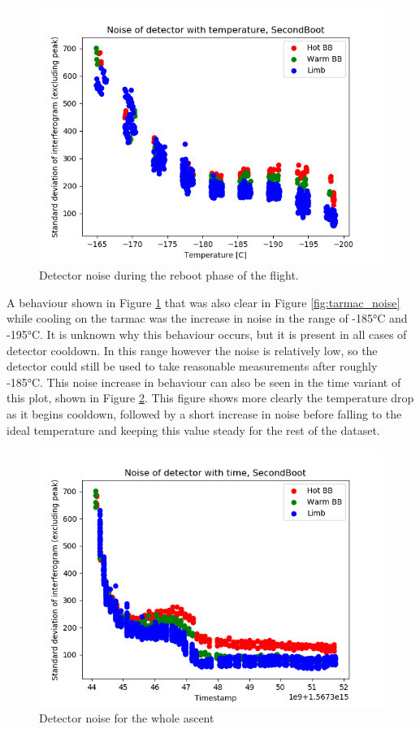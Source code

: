 \begin{figure}
\centering
  \includegraphics[width=0.8\linewidth]{mct_noise_temp_plots/SecondBoot_noisevtemp_invertedx_colours.png}
  \caption{Detector noise during the reboot phase of the flight.}
  \label{fig:secondboot_noise}
\end{figure}

A behaviour shown in Figure \ref{fig:secondboot_noise} that was also clear in Figure \ref{fig:tarmac_noise} while cooling on the tarmac was the increase in noise in the range of -185°C and -195°C. It is unknown why this behaviour occurs, but it is present in all cases of detector cooldown. In this range however the noise is relatively low, so the detector could still be used to take reasonable measurements after roughly -185°C. This noise increase in behaviour can also be seen in the time variant of this plot, shown in Figure \ref{fig:secondboot_noisetime}. This figure shows more clearly the temperature drop as it begins cooldown, followed by a short increase in noise before falling to the ideal temperature and keeping this value steady for the rest of the dataset.

\begin{figure}
\centering
  \includegraphics[width=0.8\linewidth]{mct_noise_temp_plots/SecondBoot_full_noisevtime_colours.png}
  \caption{Detector noise for the whole ascent}
  \label{fig:secondboot_noisetime}
\end{figure}

